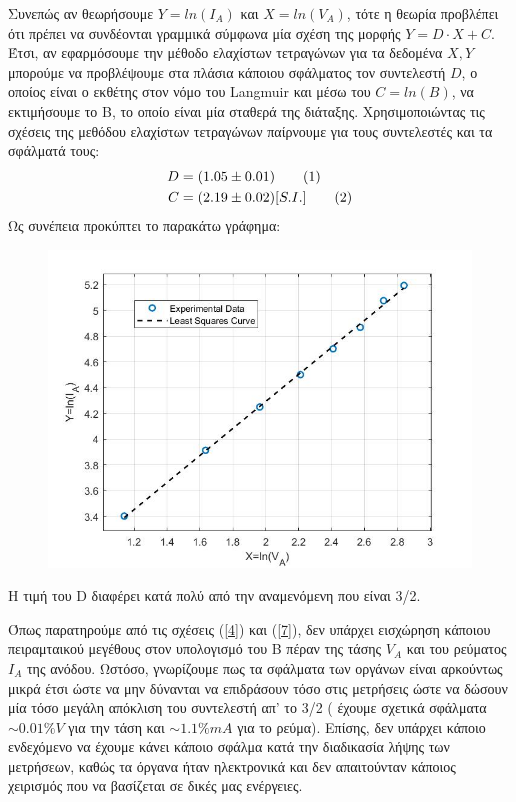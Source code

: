 \documentclass[a4paper]{article}
\newcommand\numberthis{\addtocounter{equation}{1}\tag{\theequation}}
\begin{document}
Συνεπώς αν θεωρήσουμε $Y=ln(I_A)$ και $X=ln(V_A)$, τότε η θεωρία προβλέπει ότι πρέπει να συνδέονται γραμμικά σύμφωνα μία σχέση της μορφής $Y=D\cdot X + C$. Έτσι, αν εφαρμόσουμε την μέθοδο ελαχίστων τετραγώνων για τα δεδομένα $X,Y$ μπορούμε να προβλέψουμε στα πλάσια κάποιου σφάλματος τον συντελεστή $D$, ο οποίος είναι ο εκθέτης στον νόμο του Langmuir και μέσω του $C=ln(B)$, να εκτιμήσουμε το Β, το οποίο είναι μία σταθερά της διάταξης. Χρησιμοποιώντας τις σχέσεις της μεθόδου ελαχίστων τετραγώνων παίρνουμε για τους συντελεστές και τα σφάλματά τους: 
\begin{align*}
D &= (1.05\pm0.01) \numberthis \\ 
C& = (2.19\pm0.02) [S.I.]\numberthis
\end{align*}
Ως συνέπεια προκύπτει το παρακάτω γράφημα: 

\begin{figure}[h!]
\centering
\caption{ }
\includegraphics[scale=0.4]{Langmuir.jpg}
\end{figure}

Η τιμή του D διαφέρει κατά πολύ από την αναμενόμενη που είναι 3/2. 

Όπως παρατηρούμε από τις σχέσεις (\ref{4}) και (\ref{7}), δεν υπάρχει εισχώρηση κάποιου πειραμταικού μεγέθους στον υπολογισμό του B πέραν της τάσης $V_A$ και του ρεύματος $I_A$ της ανόδου. Ωστόσο, γνωρίζουμε πως τα σφάλματα των οργάνων είναι αρκούντως μικρά έτσι ώστε να μην δύνανται να επιδράσουν τόσο στις μετρήσεις ώστε να δώσουν μία τόσο μεγάλη απόκλιση του συντελεστή απ' το 3/2 ( έχουμε σχετικά σφάλματα $\sim 0.01\%V$ για την τάση και $\sim 1.1\%mA$ για το ρεύμα). Επίσης, δεν υπάρχει κάποιο ενδεχόμενο να έχουμε κάνει κάποιο σφάλμα κατά την διαδικασία λήψης των μετρήσεων, καθώς τα όργανα ήταν ηλεκτρονικά και δεν απαιτούνταν κάποιος χειρισμός που να βασίζεται σε δικές μας ενέργειες.
\end{document}
